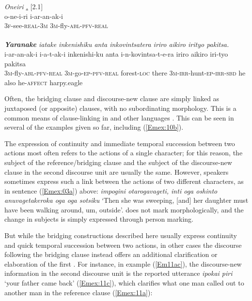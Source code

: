 \documentclass[output=paper]{LSP/langsci}
\begin{document}
\begin{exe}
\ex \label{Em10ab}
\begin{xlist}
\ex \label{Emex:10a}
\glt \textit{Oneiri \underline{.}} [2.1]\\
\gll o-ne-i-ri i-ar-an-ak-i\\
 \textsc{3f-}see\textsc{-real-3m} \textsc{3m-}fly\textsc{-abl-pfv-real}\\
\glt {}\\
\ex \label{Emex:10b}
\glt \textit{\textbf{Yaranake} iatake inkenishiku anta inkovintsatera iriro aikiro irityo pakitsa.}\\
\gll i-ar-an-ak-i i-a-t-ak-i inkenishi-ku anta i-n-kovintsa-t-e-ra iriro aikiro iri-tyo pakitsa\\     	      
   \textsc{3m-}fly\textsc{-abl-pfv-real} \textsc{3m-}go\textsc{-ep-pfv-real} forest\textsc{-loc} there \textsc{3m-irr-}hunt\textsc{-ep-irr-sbd} he also he\textsc{-affect} harpy.eagle\\
\glt {}
\end{xlist}
\end{exe}



Often, the bridging clause and discourse-new clause are simply linked as juxtaposed (or apposite) clauses, with no subordinating morphology. This is a common means of clause-linking in  and other  languages \citep[e.g.,][435]{michael08}. This can be seen in several of the examples given so far, including (\ref{Emex:10b}).

The expression of continuity and immediate temporal succession between two actions most often refers to the actions of a single character; for this reason, the subject of the reference/bridging clause and the subject of the discourse-new clause in the second discourse unit are usually the same. However, speakers sometimes express such a link between the actions of two different characters, as in sentence (\ref{Emex:03a}) above: \textit{impogini otarogavageti, inti oga oshinto anuvagetakeroka oga oga sotsiku} `Then she was sweeping, [and] her daughter must have been walking around, um, outside'.  does not mark  morphologically, and the change in subjects is simply expressed through person marking. 

But while the  bridging constructions described here usually express continuity and quick temporal succession between two actions, in other cases the discourse following the bridging clause instead offers an additional clarification or elaboration of the first . For instance, in example (\ref{Em11ac}), the discourse-new information in the second discourse unit is the reported utterance \textit{ipokai piri} `your father came back' (\ref{Emex:11c}), which clarifies what one man called out to another man in the reference clause (\ref{Emex:11a}):
\end{document}
